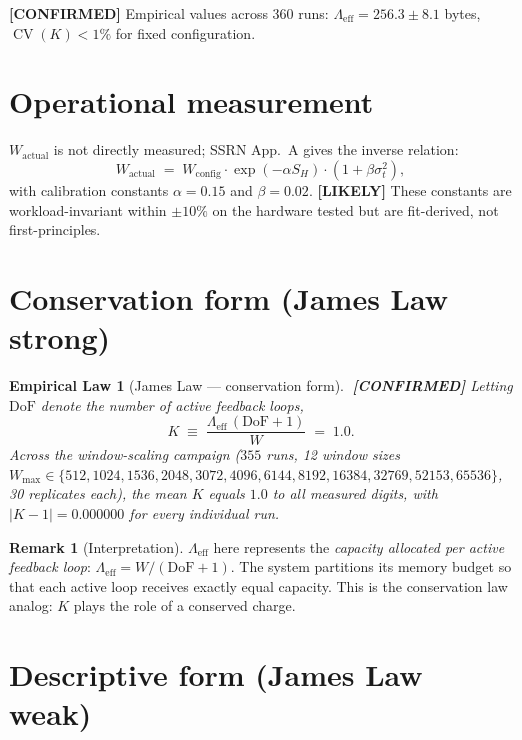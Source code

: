 \documentclass[11pt,letterpaper,openany]{book}
\theoremstyle{definition}
\newtheorem{remark}[definition]{Remark}
\theoremstyle{plain}
\newtheorem{empiricallaw}[definition]{Empirical Law}
\newcommand{\confirmed}{\textcolor{green!50!black}{\textbf{[CONFIRMED]}}\xspace}
\newcommand{\likely}{\textcolor{blue!60!black}{\textbf{[LIKELY]}}\xspace}
\newcommand{\Lambdaeff}{\Lambda_{\mathrm{eff}}}
\newcommand{\Wact}{W_{\mathrm{actual}}}
\newcommand{\Wcfg}{W_{\mathrm{config}}}
\newcommand{\Wmax}{W_{\mathrm{max}}}
\newcommand{\CV}{\operatorname{CV}}
\begin{document}
\confirmed Empirical values across $360$ runs:
$\Lambdaeff = 256.3 \pm 8.1$ bytes, $\CV(K) < 1\%$ for fixed configuration.

\section{Operational measurement}

$\Wact$ is not directly measured; SSRN App.~A gives the inverse relation:
\begin{equation}\label{eq:wact}
  \Wact \;=\; \Wcfg \cdot \exp(-\alpha S_H) \cdot (1 + \beta\sigma_t^2),
\end{equation}
with calibration constants $\alpha = 0.15$ and $\beta = 0.02$.
\likely These constants are workload-invariant within $\pm 10\%$ on the
hardware tested but are fit-derived, not first-principles.

\section{Conservation form (James Law strong)}

\begin{empiricallaw}[James Law --- conservation form]\label{law:james-strong}
$\;$\confirmed
Letting $\mathrm{DoF}$ denote the number of active feedback loops,
\begin{equation}\label{eq:james-strong}
  K \;\equiv\; \frac{\Lambdaeff\,(\mathrm{DoF}+1)}{W}\;=\;1.0.
\end{equation}
Across the window-scaling campaign ($355$ runs, 12 window sizes
$\Wmax \in \{512, 1024, 1536, 2048, 3072, 4096, 6144, 8192, 16384, 32769,
52153, 65536\}$, 30 replicates each), the mean $K$ equals $1.0$ to all
measured digits, with $|K-1|=0.000000$ for every individual run.
\end{empiricallaw}

\begin{remark}[Interpretation]
$\Lambdaeff$ here represents the \emph{capacity allocated per active feedback
loop}: $\Lambdaeff = W/(\mathrm{DoF}+1)$. The system partitions its memory
budget so that each active loop receives exactly equal capacity. This is
the conservation law analog: $K$ plays the role of a conserved charge.
\end{remark}

\section{Descriptive form (James Law weak)}
\end{document}
